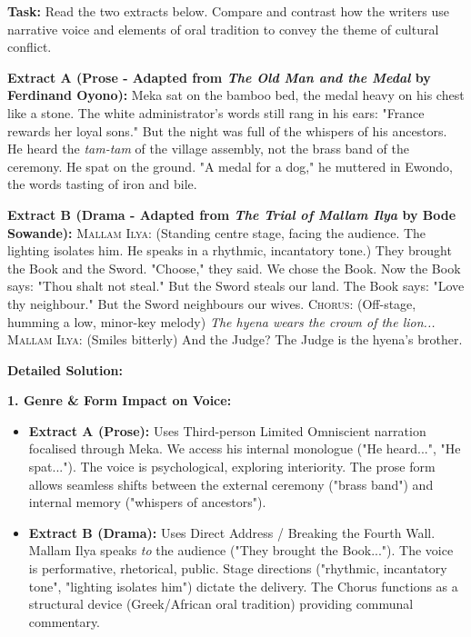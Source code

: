 \documentclass[11pt]{article}
\newcommand{\cle}[1]{{\popxbold\color{popdark}#1}}
\begin{document}
\begin{exoresolu}
\textbf{Task:} Read the two extracts below. Compare and contrast how the writers use narrative voice and elements of oral tradition to convey the theme of cultural conflict.

\textbf{Extract A (Prose - Adapted from \emph{The Old Man and the Medal} by Ferdinand Oyono):}
Meka sat on the bamboo bed, the medal heavy on his chest like a stone. The white administrator's words still rang in his ears: "France rewards her loyal sons." But the night was full of the whispers of his ancestors. He heard the \emph{tam-tam} of the village assembly, not the brass band of the ceremony. He spat on the ground. "A medal for a dog," he muttered in Ewondo, the words tasting of iron and bile.

\textbf{Extract B (Drama - Adapted from \emph{The Trial of Mallam Ilya} by Bode Sowande):}
\textsc{Mallam Ilya}: (Standing centre stage, facing the audience. The lighting isolates him. He speaks in a rhythmic, incantatory tone.)
They brought the Book and the Sword.
"Choose," they said.
We chose the Book.
Now the Book says: "Thou shalt not steal."
But the Sword steals our land.
The Book says: "Love thy neighbour."
But the Sword neighbours our wives.
\textsc{Chorus}: (Off-stage, humming a low, minor-key melody)
\textit{The hyena wears the crown of the lion...}
\textsc{Mallam Ilya}: (Smiles bitterly) And the Judge? The Judge is the hyena's brother.

\tcblower
\textbf{Detailed Solution:}

\textbf{1. Genre \& Form Impact on Voice:}
\begin{itemize}
    \item \textbf{Extract A (Prose):} Uses \cle{Third-person Limited Omniscient} narration focalised through Meka. We access his \cle{internal monologue} ("He heard...", "He spat..."). The voice is \cle{psychological}, exploring interiority. The prose form allows seamless shifts between the external ceremony ("brass band") and internal memory ("whispers of ancestors").
    \item \textbf{Extract B (Drama):} Uses \cle{Direct Address / Breaking the Fourth Wall}. Mallam Ilya speaks \emph{to} the audience ("They brought the Book..."). The voice is \cle{performative, rhetorical, public}. Stage directions ("rhythmic, incantatory tone", "lighting isolates him") dictate the delivery. The \cle{Chorus} functions as a structural device (Greek/African oral tradition) providing communal commentary.
\end{itemize}


\end{exoresolu}
\end{document}
